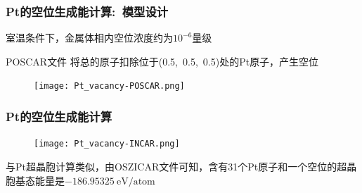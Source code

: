 \frame
{
	\frametitle{\textrm{Pt}的空位生成能计算:~模型设计}
室温条件下，金属体相内空位浓度约为$10^{-6}$量级
\vskip 5pt
{\fontsize{7.5pt}{5.2pt}\selectfont{显然不可能为了模拟一个空位，就用$10^6$量级的超晶胞。合理的做法应该是选择合适尺度的超晶胞并设计原子空位，要求超晶胞间空位相互作用可以忽略，由此计算晶格中的空位能}}%

\textrm{POSCAR}文件%
将总的原子扣除位于(0.5,~0.5,~0.5)处的\textrm{Pt}原子，产生空位%
\begin{figure}[h!]
\centering
\vskip -3pt
\texttt{[image: Pt\_vacancy-POSCAR.png]}
\caption{\fontsize{6.2pt}{5.2pt}}%
\label{Pt_vacancy-POSCAR}
\end{figure}
}

\frame
{
	\frametitle{\textrm{Pt}的空位生成能计算}
\begin{figure}[h!]
\centering
\texttt{[image: Pt\_vacancy-INCAR.png]}
\caption{\fontsize{6.2pt}{5.2pt}}%
\label{Pt_Bulk-INCAR-modified}
\end{figure}
与\textrm{Pt}超晶胞计算类似，由\textrm{OSZICAR}文件可知，含有31个\textrm{Pt}原子和一个空位的超晶胞基态能量是$-186.95325\mathrm{~eV/atom}$
}


